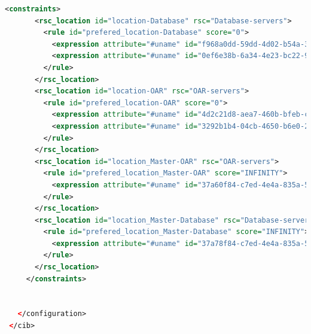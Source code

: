\documentclass[a4paper,10pt]{report}
\begin{document}
\begin{lstlisting}[language=xml]
     <constraints>
       <rsc_location id="location-Database" rsc="Database-servers">
         <rule id="prefered_location-Database" score="0">
           <expression attribute="#uname" id="f968a0dd-59dd-4d02-b54a-36c7139afa13" operation="ne" value="node1"/>
           <expression attribute="#uname" id="0ef6e38b-6a34-4e23-bc22-9dccfacc95b6" operation="ne" value="node3"/>
         </rule>
       </rsc_location>
       <rsc_location id="location-OAR" rsc="OAR-servers">
         <rule id="prefered_location-OAR" score="0">
           <expression attribute="#uname" id="4d2c21d8-aea7-460b-bfeb-cd6d22e4a17e" operation="ne" value="node2"/>
           <expression attribute="#uname" id="3292b1b4-04cb-4650-b6e0-2e4428c837a8" operation="ne" value="node4"/>
         </rule>
       </rsc_location>
       <rsc_location id="location_Master-OAR" rsc="OAR-servers">
         <rule id="prefered_location_Master-OAR" score="INFINITY">
           <expression attribute="#uname" id="37a60f84-c7ed-4e4a-835a-55382961c990" operation="eq" value="node1"/>
         </rule>
       </rsc_location>
       <rsc_location id="location_Master-Database" rsc="Database-servers">
         <rule id="prefered_location_Master-Database" score="INFINITY">
           <expression attribute="#uname" id="37a78f84-c7ed-4e4a-835a-54382451c990" operation="eq" value="node2"/>
         </rule>
       </rsc_location>
     </constraints>


   </configuration>
 </cib>
\end{lstlisting}
\end{document}

